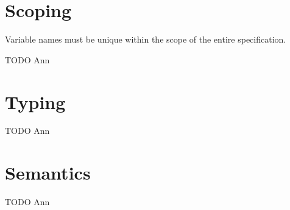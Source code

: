 \section{Scoping}
\label{sec:scoping}

Variable names must be unique within the scope of the entire \vnnlib{} specification.

TODO Ann

\section{Typing}
\label{sec:typing}

TODO Ann

\section{Semantics}
\label{sec:semantics}

TODO Ann

